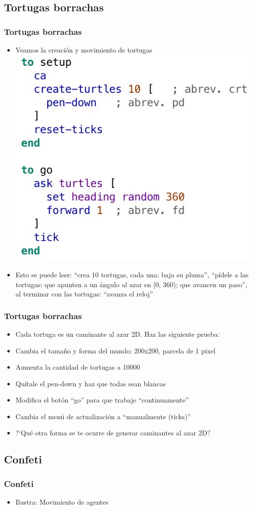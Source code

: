 \documentclass{beamer}
\begin{document}
\subsection{Tortugas borrachas}
\begin{frame}[t]
\frametitle{Tortugas borrachas}
\begin{itemize}[<+-| alert@+>]
	\item Veamos la creación y movimiento de tortugas
\includegraphics[width=.5\textwidth]{tortugas_borrachas}
\item Esto se puede leer: ``crea 10 tortugas, cada una: baja su pluma'', ``pídele a las tortugas: que apunten a un ángulo al azar en [0, 360); que avancen un paso'', al terminar con las tortugas: ``avanza el reloj''
\end{itemize}
\end{frame}

\begin{frame}[t]
\frametitle{Tortugas borrachas}
\begin{itemize}[<+-| alert@+>]
	\item Cada tortuga es un caminante al azar 2D. Haz las siguiente prueba:
	\item Cambia el tamaño y forma del mundo: 200x200, parcela de 1 pixel
	\item Aumenta la cantidad de tortugas a 10000
	\item Quítale el pen-down y haz que todas sean blancas
	\item Modifica el botón ``go'' para que trabaje ``continuamente''
	\item Cambia el menú de actualización a ``manualmente (ticks)''
	\item ?`Qué otra forma se te ocurre de generar caminantes al azar 2D?
\end{itemize}
\end{frame}

\subsection{Confeti}
\begin{frame}[t]
\frametitle{Confeti}
\begin{itemize}[<+-| alert@+>]
	\item Ilustra: Movimiento de agentes
\end{itemize}

\end{frame}
\end{document}
